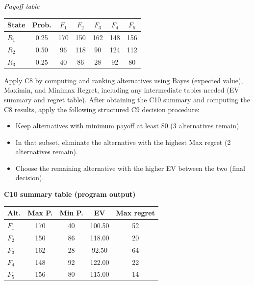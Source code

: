 \begin{ExamProblems}
		\begin{center}
			\textit{Payoff table} \\
			\begin{tabular}{l c c c c c c}
				\hline
				State& Prob. & $F_1$ & $F_2$ & $F_3$ & $F_4$ & $F_5$ \\
				\hline
				$R_1$ & 0.25 & 170 & 150 & 162 & 148 & 156 \\
				$R_2$ & 0.50 & 96 & 118 & 90 & 124 & 112 \\
				$R_3$ & 0.25 & 40 & 86 & 28 & 92 & 80 \\
				\hline
			\end{tabular}
		\end{center}
		
		Apply C8 by computing and ranking alternatives using Bayes (expected value), Maximin, and Minimax Regret, including any intermediate tables needed (EV summary and regret table).
		After obtaining the C10 summary and computing the C8 results, apply the following structured C9 decision procedure:
		\begin{itemize}
			\item Keep alternatives with minimum payoff at least 80 (3 alternatives remain).
			\item In that subset, eliminate the alternative with the highest Max regret (2 alternatives remain).
			\item Choose the remaining alternative with the higher EV between the two (final decision).
		\end{itemize}
		
		\vspace{0.25cm}
		
		\textbf{C10 summary table (program output)}\par
		\begin{center}
			\begin{tabular}{l c c c c}
				\hline
				Alt. & Max P. & Min P. & EV & Max regret \\
				\hline
				$F_1$ & 170 & 40 & 100.50 & 52 \\
				$F_2$ & 150 & 86 & 118.00 & 20 \\
				$F_3$ & 162 & 28 & 92.50 & 64 \\
				$F_4$ & 148 & 92 & 122.00 & 22 \\
				$F_5$ & 156 & 80 & 115.00 & 14 \\
				\hline
			\end{tabular}
		\end{center}
		

\end{ExamProblems}
